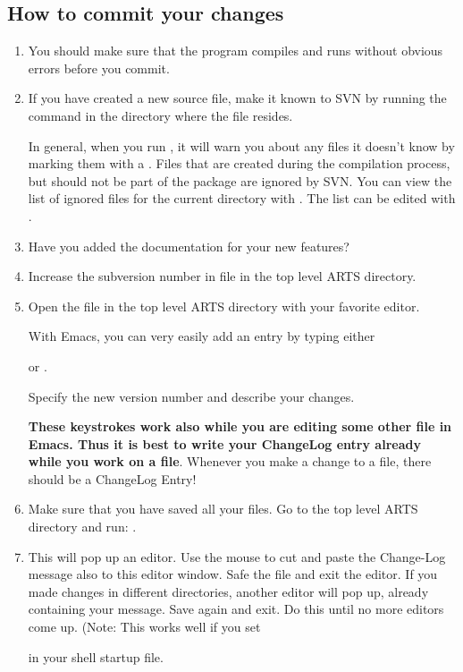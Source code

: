 \subsection{How to commit your changes}
\begin{enumerate}
\item You should make sure that the program compiles and runs without
  obvious errors before you commit.
\item If you have created a new source file, make it known to SVN by
  running the command  in the directory where
  the file resides.
  
  In general, when you run , it will warn you about
  any files it doesn't know by marking them with a . Files
  that are created during the compilation process, but should not be
  part of the package are ignored by SVN. You can view the list of ignored
  files for the current directory with .
  The list can be edited with .
\item Have you added the documentation for your new features?
\item Increase the subversion number in file  in
  the top level ARTS directory.
\item Open the file  in the top level ARTS directory
  with your favorite editor.
  
  With Emacs, you can very easily add an entry by typing either
  \begin{quote}
  \end{quote}
  or .
  
  Specify the new version number and describe your changes.

  \textbf{These keystrokes work also while you are editing some other
    file in Emacs. Thus it is best to write your ChangeLog entry
    already while you work on a file}. Whenever you make a change to a
  file, there should be a ChangeLog Entry!
\item Make sure that you have saved all your files. Go to the top
  level ARTS directory and run: .
\item This will pop up an editor. Use the mouse to cut and paste the
  Change-Log message also to this editor window. Safe the file and exit
  the editor. If you made changes in different directories, another
  editor will pop up, already containing your message. Save again and
  exit. Do this until no more editors come up. (Note: This works well
  if you set
  \begin{quote}
  \end{quote}
  in your shell startup file.
 

\end{enumerate}
